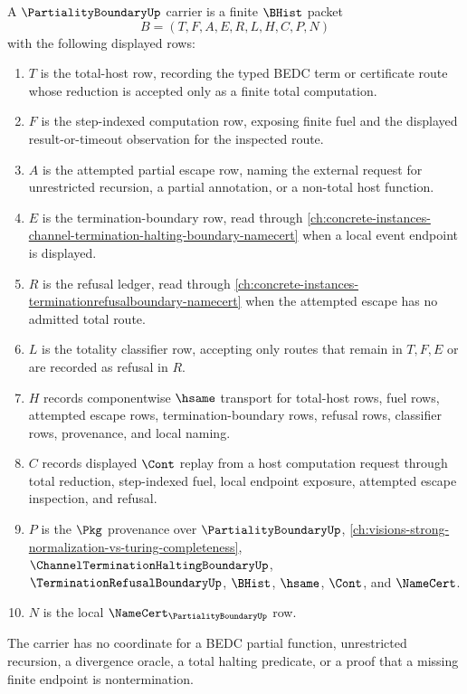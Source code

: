 \begin{definition}
\label{def:partiality-boundary-carrier}
A $\PartialityBoundaryUp$ carrier is a finite $\BHist$ packet
$$
B=(T,F,A,E,R,L,H,C,P,N)
$$
with the following displayed rows:
\begin{enumerate}
\item $T$ is the total-host row, recording the typed BEDC term or certificate route whose reduction is accepted only as a finite total computation.
\item $F$ is the step-indexed computation row, exposing finite fuel and the displayed result-or-timeout observation for the inspected route.
\item $A$ is the attempted partial escape row, naming the external request for unrestricted recursion, a partial annotation, or a non-total host function.
\item $E$ is the termination-boundary row, read through \autoref{ch:concrete-instances-channel-termination-halting-boundary-namecert} when a local event endpoint is displayed.
\item $R$ is the refusal ledger, read through \autoref{ch:concrete-instances-terminationrefusalboundary-namecert} when the attempted escape has no admitted total route.
\item $L$ is the totality classifier row, accepting only routes that remain in $T,F,E$ or are recorded as refusal in $R$.
\item $H$ records componentwise $\hsame$ transport for total-host rows, fuel rows, attempted escape rows, termination-boundary rows, refusal rows, classifier rows, provenance, and local naming.
\item $C$ records displayed $\Cont$ replay from a host computation request through total reduction, step-indexed fuel, local endpoint exposure, attempted escape inspection, and refusal.
\item $P$ is the $\Pkg$ provenance over $\PartialityBoundaryUp$, \autoref{ch:visions-strong-normalization-vs-turing-completeness}, $\ChannelTerminationHaltingBoundaryUp$, $\TerminationRefusalBoundaryUp$, $\BHist$, $\hsame$, $\Cont$, and $\NameCert$.
\item $N$ is the local $\NameCert_{\PartialityBoundaryUp}$ row.
\end{enumerate}
The carrier has no coordinate for a BEDC partial function, unrestricted recursion, a divergence oracle, a total halting predicate, or a proof that a missing finite endpoint is nontermination.
\end{definition}

